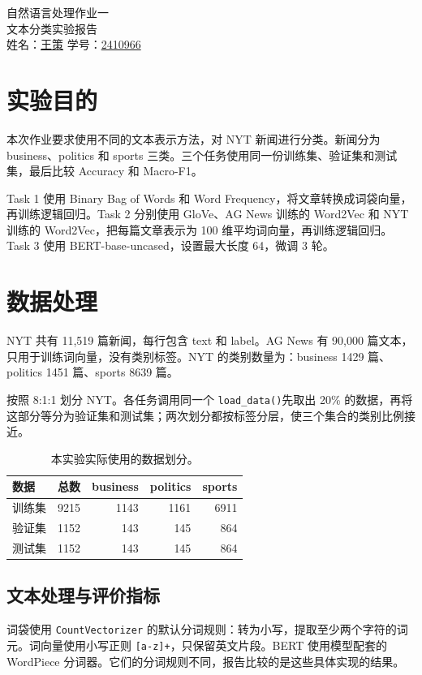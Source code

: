 \documentclass[12pt, a4paper, fontset=fandol]{ctexart}
\begin{document}
\begin{center}
    \Huge{自然语言处理作业一} \\[0.5cm]
    \Large{文本分类实验报告} \\[0.5cm]
    \normalsize
    姓名：\underline{王策} \quad 学号：\underline{2410966}\\[0.2cm]
\end{center}
\vspace{0.5cm}
{\small\linespread{1}\selectfont\tableofcontents}
\clearpage

\section{实验目的}
本次作业要求使用不同的文本表示方法，对 NYT 新闻进行分类。新闻分为 business、politics 和 sports 三类。三个任务使用同一份训练集、验证集和测试集，最后比较 Accuracy 和 Macro-F1。

Task 1 使用 Binary Bag of Words 和 Word Frequency，将文章转换成词袋向量，再训练逻辑回归。Task 2 分别使用 GloVe、AG News 训练的 Word2Vec 和 NYT 训练的 Word2Vec，把每篇文章表示为 100 维平均词向量，再训练逻辑回归。Task 3 使用 BERT-base-uncased，设置最大长度 64，微调 3 轮。

\section{数据处理}
NYT 共有 11,519 篇新闻，每行包含 text 和 label。AG News 有 90,000 篇文本，只用于训练词向量，没有类别标签。NYT 的类别数量为：business 1429 篇、politics 1451 篇、sports 8639 篇。

按照 8:1:1 划分 NYT。各任务调用同一个 \texttt{load\_data()}先取出 20\% 的数据，再将这部分等分为验证集和测试集；两次划分都按标签分层，使三个集合的类别比例接近。
\begin{table}[H]\centering
\begin{tabular}{lrrrr}\hline\hline
数据 & 总数 & business & politics & sports\\\hline
训练集 & 9215 & 1143 & 1161 & 6911\\
验证集 & 1152 & 143 & 145 & 864\\
测试集 & 1152 & 143 & 145 & 864\\\hline\hline
\end{tabular}
\caption{本实验实际使用的数据划分。}
\end{table}

\subsection{文本处理与评价指标}
词袋使用 \texttt{CountVectorizer} 的默认分词规则：转为小写，提取至少两个字符的词元。词向量使用小写正则 \texttt{[a-z]+}，只保留英文片段。BERT 使用模型配套的 WordPiece 分词器。它们的分词规则不同，报告比较的是这些具体实现的结果。
\end{document}
